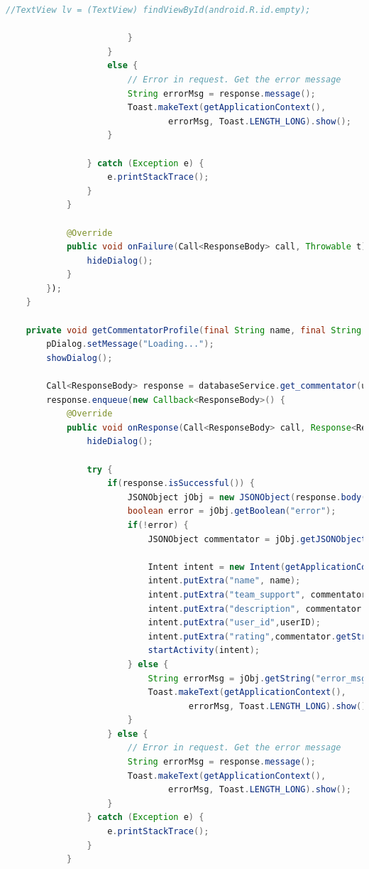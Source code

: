 \documentclass{article}
\begin{document}
\begin{landscape}
\begin{lstlisting}[language=Java, basicstyle=\tiny]
                            //TextView lv = (TextView) findViewById(android.R.id.empty);

                        }
                    }
                    else {
                        // Error in request. Get the error message
                        String errorMsg = response.message();
                        Toast.makeText(getApplicationContext(),
                                errorMsg, Toast.LENGTH_LONG).show();
                    }

                } catch (Exception e) {
                    e.printStackTrace();
                }
            }

            @Override
            public void onFailure(Call<ResponseBody> call, Throwable t) {
                hideDialog();
            }
        });
    }

    private void getCommentatorProfile(final String name, final String userID, Database databaseService) {
        pDialog.setMessage("Loading...");
        showDialog();

        Call<ResponseBody> response = databaseService.get_commentator(userID);
        response.enqueue(new Callback<ResponseBody>() {
            @Override
            public void onResponse(Call<ResponseBody> call, Response<ResponseBody> response) {
                hideDialog();

                try {
                    if(response.isSuccessful()) {
                        JSONObject jObj = new JSONObject(response.body().string());
                        boolean error = jObj.getBoolean("error");
                        if(!error) {
                            JSONObject commentator = jObj.getJSONObject("commentator");

                            Intent intent = new Intent(getApplicationContext(),UserProfile.class);
                            intent.putExtra("name", name);
                            intent.putExtra("team_support", commentator.getString("team_support"));
                            intent.putExtra("description", commentator.getString("description"));
                            intent.putExtra("user_id",userID);
                            intent.putExtra("rating",commentator.getString("rating"));
                            startActivity(intent);
                        } else {
                            String errorMsg = jObj.getString("error_msg");
                            Toast.makeText(getApplicationContext(),
                                    errorMsg, Toast.LENGTH_LONG).show();
                        }
                    } else {
                        // Error in request. Get the error message
                        String errorMsg = response.message();
                        Toast.makeText(getApplicationContext(),
                                errorMsg, Toast.LENGTH_LONG).show();
                    }
                } catch (Exception e) {
                    e.printStackTrace();
                }
            }


\end{lstlisting}
\end{landscape}
\end{document}
